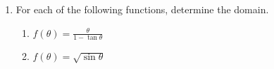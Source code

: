 \documentclass[12pt]{article}
\newif\ifans
\begin{document}
\begin{enumerate}
\ifans\fbox{\parbox{1\linewidth}{
\begin{center}
\begin{tabular}{l|c|c}
& Domain & Range\\
\hline
$\sin{\theta}$ & $(-\infty,\infty)$ & $[-1,1]$\\
\hline
$\cos{\theta}$ & $(-\infty,\infty)$ & $[-1,1]$\\
\hline
$\tan{\theta}$ & $x\neq(2k+1)\frac{\pi}{2}$ & $(-\infty,\infty)$\\
\hline
$\csc{\theta}$ & $x\neq \pi k$ & $(-\infty,-1]\cup[1,\infty)$\\
\hline
$\sec{\theta}$ & $x\neq(2k+1)\frac{\pi}{2}$ & $(-\infty,-1]\cup[1,\infty)$\\
\hline
$\cot{\theta}$ & $x\neq \pi k$ & $(-\infty,\infty)$\\
\end{tabular}
\end{center}
Where $k$ is any integer.
}} \fi

\item For each of the following functions, determine the domain.  

\begin{enumerate}

\item $f(\theta)=\frac{\theta}{1-\tan{\theta}}$

\ifans\fbox{$\theta\neq \frac{\pi}{2}k$ where $k$ is any integer.} \fi

\item $f(\theta)=\sqrt{\sin{\theta}}$

\ifans \fbox{ $\bigcup\limits_{k=-\infty}^{\infty} \left[2k \pi, (2k+1)\pi\right]=\dots [-2\pi,-\pi]\cup[0,\pi]\cup[2\pi,3\pi]\dots$} \fi

\end{enumerate}


\end{enumerate}
\end{document}
